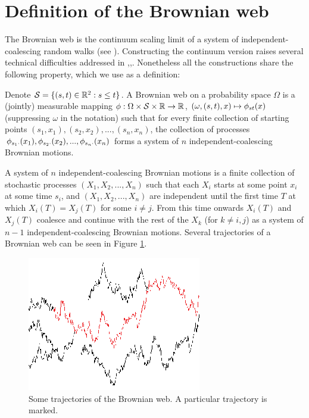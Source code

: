 {
\section{Definition of the Brownian web}
\label{sec:brownian-web-definition}

The Brownian web is the continuum scaling limit of a system of
independent-coalescing random walks (see
\cite{tsirelson-lecture-course}).  Constructing the
continuum version raises several technical difficulties addressed in
\cite{toth-werner},\cite{fontes-et-al},\cite{norris-turner-convergence-to-bw}.
Nonetheless all the
constructions share the following property, which we use as a
definition:

  Denote $\mathcal{S}=\{(s, t) \in \mathbb{R}^2 : s \le t\}$.
  A Brownian web on a probability space $\Omega$ is a (jointly)
  measurable mapping $\phi : \Omega \times \mathcal{S} \times \mathbb{R}
  \to \mathbb{R}$, $(\omega, (s, t), x) \mapsto \phi_{{s}{t}}(x)$ (suppressing
  $\omega$ in the notation) such that for every finite collection of
  starting points $(s_1, x_1),(s_2, x_2),...,(s_n, x_n)$, the
  collection of processes $\phi_{{s_1}{\cdot}}(x_1),
  \phi_{{s_2}{\cdot}}(x_2),...,\phi_{{s_n}{\cdot}}(x_n)$
  forms a system of $n$ independent-coalescing Brownian motions.

  A system of $n$ independent-coalescing Brownian motions is a finite
  collection of stochastic processes $(X_1, X_2,...,X_n)$ such that
  each $X_i$ starts at some point $x_i$ at some time $s_i$, and $(X_1,
  X_2,...,X_n)$ are independent until the first time $T$ at which
  $X_i(T)=X_j(T)$ for some $i\neq j$. From this time onwards $X_i(T)$
  and $X_j(T)$ coalesce and continue with the rest of the $X_k$ (for
  $k\neq i,j$) as a system of $n-1$ independent-coalescing Brownian motions.
  Several trajectories of a Brownian web can be seen in Figure
  \ref{fig:bw-trajectories}.

\begin{figure}
   \centering
   \includegraphics[scale=2]{sometraj.eps}
   \caption{Some trajectories of the Brownian web. A particular trajectory is marked.}
  \label{fig:bw-trajectories}
\end{figure}
}
